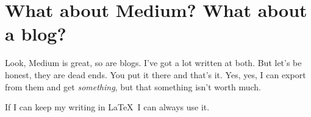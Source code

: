 \section{What about Medium? What about a blog?}
\label{sec:medium}

Look, Medium is great, so are blogs.  I've got a lot written at both.  But let's be honest, they are dead ends.  You put it there and that's it.  Yes, yes, I can export from them and get \emph{something}, but that something isn't worth much.

If I can keep my writing in \LaTeX\ I can always use it.